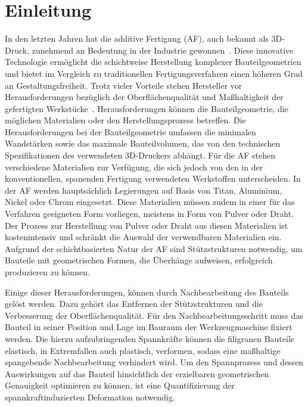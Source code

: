 \chapter{Einleitung}

In den letzten Jahren hat die additive Fertigung (AF), auch bekannt als 3D-Druck, 
zunehmend an Bedeutung in der Industrie gewonnen~\cite{JADHAV20222094}. 
Diese innovative Technologie 
ermöglicht die schichtweise Herstellung komplexer Bauteilgeometrien und bietet im 
Vergleich zu traditionellen Fertigungsverfahren einen höheren Grad an 
Gestaltungsfreiheit. Trotz vieler Vorteile stehen Hersteller vor 
Herausforderungen bezüglich der Oberflächenqualität und Maßhaltigkeit 
der gefertigten Werkstücke~\cite{SCHNECK201919}.
Herausforderungen können die Bauteilgeometrie, die möglichen Materialien oder 
den Herstellungsprozess betreffen.
Die Herausforderungen bei der Bauteilgeometrie umfassen die minimalen 
Wandstärken sowie das maximale Bauteilvolumen, das von den technischen 
Spezifikationen des verwendeten 3D-Druckers abhängt. Für die AF stehen 
verschiedene Materialien zur Verfügung, 
die sich jedoch von den in der konventionellen, spanenden Fertigung 
verwendeten Werkstoffen unterscheiden. In der AF werden hauptsächlich Legierungen 
auf Basis von Titan, Aluminium, Nickel oder Chrom eingesetzt. Diese Materialien
müssen zudem in einer für das Verfahren geeigneten Form vorliegen, 
meistens in Form von Pulver oder Draht. Der Prozess zur Herstellung von 
Pulver oder Draht aus diesen Materialien ist kostenintensiv und schränkt
die Auswahl der verwendbaren Materialien ein. Aufgrund der 
schichtbasierten Natur der AF sind Stützstrukturen 
notwendig, um Bauteile mit geometrischen Formen, die Überhänge aufweisen, 
erfolgreich produzieren zu können. \label{drawbacks_af}
~\cite{Vranic.2017}

Einige dieser Herausforderungen, können durch Nachbearbeitung des Bauteils 
gelöst werden. Dazu gehört das Entfernen der Stützstrukturen und die Verbesserung
der Oberflächenqualität.
Für den Nachbearbeitungsschritt muss das Bauteil in seiner Position und Lage im Bauraum
der Werkzeugmaschine fixiert werden. Die hierzu aufzubringenden Spannkräfte 
können die filigranen Bauteile elastisch, in Extremfallen auch plastisch, verformen, 
sodass eine maßhaltige spangebende Nachbearbeitung verhindert wird. 
Um den Spannprozess und dessen Auswirkungen auf das Bauteil hinsichtlich 
der erzielbaren geometrischen Genauigkeit optimieren zu
können, ist eine Quantifizierung der spannkraftinduzierten Deformation notwendig.~\cite{newMethod}

